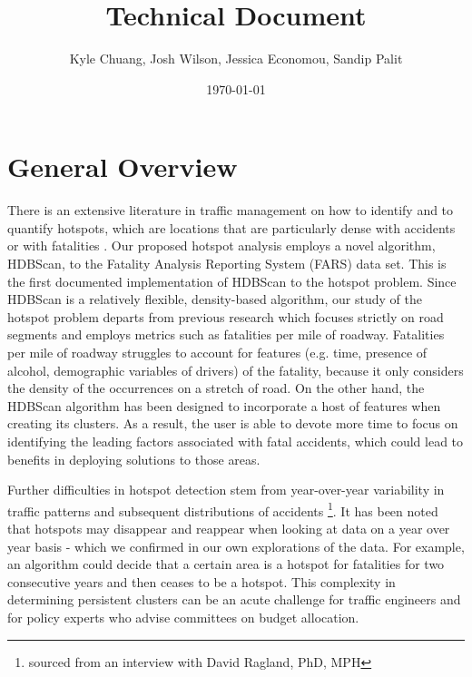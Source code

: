 \documentclass{article}
\begin{document}
\title{Technical Document}
\date{\today}
\author{Kyle Chuang, Josh Wilson, Jessica Economou, Sandip Palit}

\section{General Overview}

 There is an extensive literature in traffic management on how to identify and to quantify hotspots, which are locations that are particularly dense with accidents or with fatalities \cite{dougru2015comparison, zhang2018dijkstra, steenberghen2004intra}. Our proposed hotspot analysis employs a novel algorithm, HDBScan, to the Fatality Analysis Reporting System (FARS) data set. This is the first documented implementation of HDBScan to the hotspot problem. Since HDBScan is a relatively flexible, density-based algorithm, our study of the hotspot problem departs from previous research which focuses strictly on road segments and employs metrics such as fatalities per mile of roadway. Fatalities per mile of roadway struggles to account for features (e.g. time, presence of alcohol, demographic variables of drivers) of the fatality, because it only considers the density of the occurrences on a stretch of road. On the other hand, the HDBScan algorithm has been designed to incorporate a host of features when creating its clusters. As a result, the user is able to devote more time to focus on identifying the leading factors associated with fatal accidents, which could lead to benefits in deploying solutions to those areas.

Further difficulties in hotspot detection stem from year-over-year variability in traffic patterns and subsequent distributions of accidents \footnote {sourced from an interview with David Ragland, PhD, MPH}. It has been noted that hotspots may disappear and reappear when looking at data on a year over year basis - which we confirmed in our own explorations of the data. For example, an algorithm could decide that a certain area is a hotspot for fatalities for two consecutive years and then ceases to be a hotspot. This complexity in determining persistent clusters can be an acute challenge for traffic engineers and for policy experts who advise committees on budget allocation.
\end{document}
